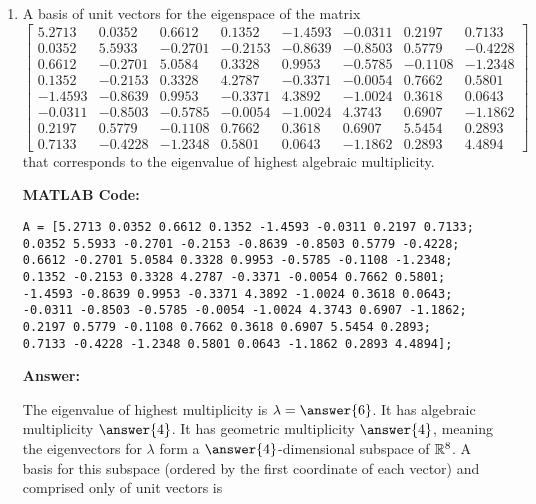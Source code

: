 \documentclass{ximera}
\begin{document}
\begin{example}
\begin{enumerate}
    \item A basis of unit vectors for the eigenspace of the matrix \[
\begin{bmatrix} 
5.2713 & 0.0352 & 0.6612 & 0.1352 & -1.4593 & -0.0311 & 0.2197 & 0.7133 \\ 
0.0352 & 5.5933 & -0.2701 & -0.2153 & -0.8639 & -0.8503 & 0.5779 & -0.4228 \\ 
0.6612 & -0.2701 & 5.0584 & 0.3328 & 0.9953 & -0.5785 & -0.1108 & -1.2348 \\ 
0.1352 & -0.2153 & 0.3328 & 4.2787 & -0.3371 & -0.0054 & 0.7662 & 0.5801 \\ 
-1.4593 & -0.8639 & 0.9953 & -0.3371 & 4.3892 & -1.0024 & 0.3618 & 0.0643 \\ 
-0.0311 & -0.8503 & -0.5785 & -0.0054 & -1.0024 & 4.3743 & 0.6907 & -1.1862 \\ 
0.2197 & 0.5779 & -0.1108 & 0.7662 & 0.3618 & 0.6907 & 5.5454 & 0.2893 \\ 
0.7133 & -0.4228 & -1.2348 & 0.5801 & 0.0643 & -1.1862 & 0.2893 & 4.4894 
\end{bmatrix}
\] that corresponds to the eigenvalue of highest algebraic multiplicity.

\textbf{MATLAB Code:}
\begin{verbatim}
A = [5.2713 0.0352 0.6612 0.1352 -1.4593 -0.0311 0.2197 0.7133;
0.0352 5.5933 -0.2701 -0.2153 -0.8639 -0.8503 0.5779 -0.4228;
0.6612 -0.2701 5.0584 0.3328 0.9953 -0.5785 -0.1108 -1.2348;
0.1352 -0.2153 0.3328 4.2787 -0.3371 -0.0054 0.7662 0.5801;
-1.4593 -0.8639 0.9953 -0.3371 4.3892 -1.0024 0.3618 0.0643;
-0.0311 -0.8503 -0.5785 -0.0054 -1.0024 4.3743 0.6907 -1.1862;
0.2197 0.5779 -0.1108 0.7662 0.3618 0.6907 5.5454 0.2893;
0.7133 -0.4228 -1.2348 0.5801 0.0643 -1.1862 0.2893 4.4894];
\end{verbatim}


\textbf{Answer:}

The eigenvalue of highest multiplicity is $\lambda=\answer{6}$. It has algebraic multiplicity $\answer{4}$. It has geometric multiplicity $\answer{4}$, meaning the eigenvectors for $\lambda$ form a $\answer{4}$-dimensional subspace of $\mathbb{R}^8$. A basis for this subspace (ordered by the first coordinate of each vector) and comprised only of unit vectors is


\end{enumerate}
\end{example}
\end{document}
